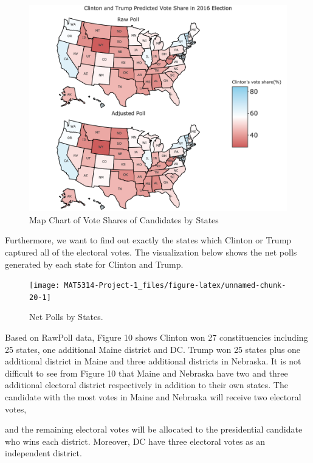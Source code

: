 \documentclass[
  12pt,
]{article}
\begin{document}
\begin{figure}
\centering
\includegraphics{./Figures/mapchart_1_2.png}
\caption{Map Chart of Vote Shares of Candidates by States}
\end{figure}

Furthermore, we want to find out exactly the states which Clinton or
Trump captured all of the electoral votes. The visualization below shows
the net polls generated by each state for Clinton and Trump.

\begin{minipage}[t]{0.7\textwidth}
\begin{figure}
\texttt{[image: MAT5314-Project-1\_files/figure-latex/unnamed-chunk-20-1]} \caption{Net Polls by States.}\label{fig:unnamed-chunk-20}
\end{figure}
\end{minipage}
\begin{minipage}[t]{0.3\textwidth}
\vspace{0pt}
Based on RawPoll data, Figure 10 shows Clinton won 27 constituencies including 25 states, one additional Maine district and DC. Trump won 25 states plus one additional district in Maine and three additional districts in Nebraska. It is not difficult to see from Figure 10 that Maine and Nebraska have two and three additional electoral district respectively in addition to their own states. The candidate with the most votes in Maine and Nebraska will receive two electoral votes,
\end{minipage}

and the remaining electoral votes will be allocated to the presidential
candidate who wins each district. Moreover, DC have three electoral
votes as an independent district.
\end{document}
